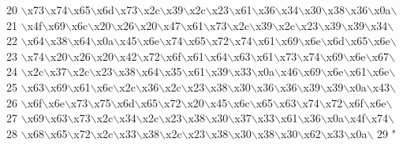 \begin{DoxyCode}
20 \textcolor{stringliteral}{\(\backslash\)x73\(\backslash\)x74\(\backslash\)x65\(\backslash\)x6d\(\backslash\)x73\(\backslash\)x2c\(\backslash\)x39\(\backslash\)x2c\(\backslash\)x23\(\backslash\)x61\(\backslash\)x36\(\backslash\)x34\(\backslash\)x30\(\backslash\)x38\(\backslash\)x36\(\backslash\)x0a\(\backslash\)}
21 \textcolor{stringliteral}{\(\backslash\)x4f\(\backslash\)x69\(\backslash\)x6c\(\backslash\)x20\(\backslash\)x26\(\backslash\)x20\(\backslash\)x47\(\backslash\)x61\(\backslash\)x73\(\backslash\)x2c\(\backslash\)x39\(\backslash\)x2c\(\backslash\)x23\(\backslash\)x39\(\backslash\)x39\(\backslash\)x34\(\backslash\)}
22 \textcolor{stringliteral}{\(\backslash\)x64\(\backslash\)x38\(\backslash\)x64\(\backslash\)x0a\(\backslash\)x45\(\backslash\)x6e\(\backslash\)x74\(\backslash\)x65\(\backslash\)x72\(\backslash\)x74\(\backslash\)x61\(\backslash\)x69\(\backslash\)x6e\(\backslash\)x6d\(\backslash\)x65\(\backslash\)x6e\(\backslash\)}
23 \textcolor{stringliteral}{\(\backslash\)x74\(\backslash\)x20\(\backslash\)x26\(\backslash\)x20\(\backslash\)x42\(\backslash\)x72\(\backslash\)x6f\(\backslash\)x61\(\backslash\)x64\(\backslash\)x63\(\backslash\)x61\(\backslash\)x73\(\backslash\)x74\(\backslash\)x69\(\backslash\)x6e\(\backslash\)x67\(\backslash\)}
24 \textcolor{stringliteral}{\(\backslash\)x2c\(\backslash\)x37\(\backslash\)x2c\(\backslash\)x23\(\backslash\)x38\(\backslash\)x64\(\backslash\)x35\(\backslash\)x61\(\backslash\)x39\(\backslash\)x33\(\backslash\)x0a\(\backslash\)x46\(\backslash\)x69\(\backslash\)x6e\(\backslash\)x61\(\backslash\)x6e\(\backslash\)}
25 \textcolor{stringliteral}{\(\backslash\)x63\(\backslash\)x69\(\backslash\)x61\(\backslash\)x6c\(\backslash\)x2c\(\backslash\)x36\(\backslash\)x2c\(\backslash\)x23\(\backslash\)x38\(\backslash\)x30\(\backslash\)x36\(\backslash\)x36\(\backslash\)x39\(\backslash\)x39\(\backslash\)x0a\(\backslash\)x43\(\backslash\)}
26 \textcolor{stringliteral}{\(\backslash\)x6f\(\backslash\)x6e\(\backslash\)x73\(\backslash\)x75\(\backslash\)x6d\(\backslash\)x65\(\backslash\)x72\(\backslash\)x20\(\backslash\)x45\(\backslash\)x6c\(\backslash\)x65\(\backslash\)x63\(\backslash\)x74\(\backslash\)x72\(\backslash\)x6f\(\backslash\)x6e\(\backslash\)}
27 \textcolor{stringliteral}{\(\backslash\)x69\(\backslash\)x63\(\backslash\)x73\(\backslash\)x2c\(\backslash\)x34\(\backslash\)x2c\(\backslash\)x23\(\backslash\)x38\(\backslash\)x30\(\backslash\)x37\(\backslash\)x33\(\backslash\)x61\(\backslash\)x36\(\backslash\)x0a\(\backslash\)x4f\(\backslash\)x74\(\backslash\)}
28 \textcolor{stringliteral}{\(\backslash\)x68\(\backslash\)x65\(\backslash\)x72\(\backslash\)x2c\(\backslash\)x33\(\backslash\)x38\(\backslash\)x2c\(\backslash\)x23\(\backslash\)x38\(\backslash\)x30\(\backslash\)x38\(\backslash\)x30\(\backslash\)x62\(\backslash\)x33\(\backslash\)x0a\(\backslash\)}
29 \textcolor{stringliteral}{"}
\end{DoxyCode}
\hypertarget{namespacechart__rc3_a58117fa1385438aac8becbe7fa4fb4f2}{}
